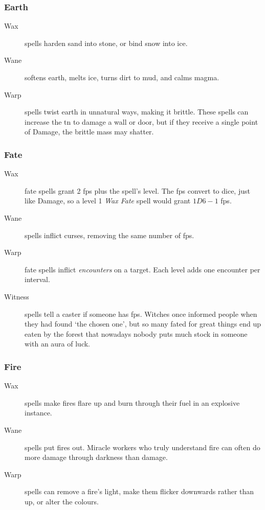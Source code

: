 \begin{multicols}{2}
\subsubsection{Earth}

\begin{description}
  \item[Wax]
  spells harden sand into stone, or bind snow into ice.
  \item[Wane]
  softens earth, melts ice, turns dirt to mud, and calms magma.
  \item[Warp]
  spells twist earth in unnatural ways, making it brittle.
  These spells can increase the \gls{tn} to damage a wall or door, but if they receive a single point of Damage, the brittle mass may shatter.
\end{description}

\subsubsection{Fate}

\begin{description}
  \item[Wax]
  fate spells grant 2 \glspl{fp} plus the spell's level.
  The \glspl{fp} convert to dice, just like Damage, so a level 1 \textit{Wax Fate} spell would grant $1D6-1$ \glspl{fp}.
  \item[Wane]
  spells inflict curses, removing the same number of \glspl{fp}.
  \item[Warp]
  fate spells inflict \emph{encounters} on a target.
  Each level adds one encounter per interval.%
  \iftoggle{judgement}{%
    \footnote{\Glspl{gm} looking for encounter ideas can find a system in \textit{Judgement}: \nameref{encounters}, \autopageref{encounters}.}%
  }{}
  \item[Witness]
  spells tell a caster if someone has \glspl{fp}.
  Witches once informed people when they had found `the chosen one', but so many fated for great things end up eaten by the forest that nowadays nobody puts much stock in someone with an aura of luck.
\end{description}

\subsubsection{Fire}

\begin{description}
  \item[Wax]
  spells make fires flare up and burn through their fuel in an explosive instance.
  \item[Wane]
  spells put fires out.
  Miracle workers who truly understand fire can often do more damage through darkness than damage.
  \item[Warp]
  spells can remove a fire's light, make them flicker downwards rather than up, or alter the colours.
\end{description}


\end{multicols}

